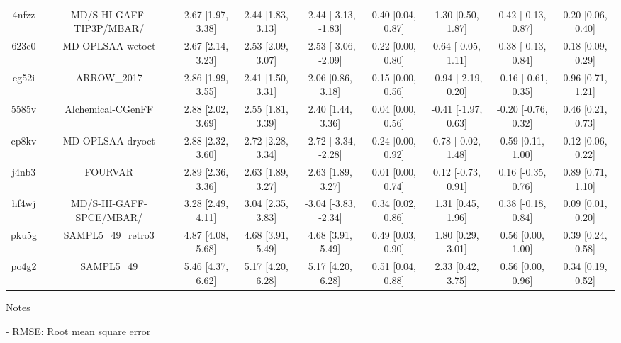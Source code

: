 \documentclass{article}
\begin{document}
\begin{center}
\begin{longtable}{|ccccccccc|}
 4nfzz &                           MD/S-HI-GAFF-TIP3P/MBAR/ &  2.67 [1.97, 3.38] &  2.44 [1.83, 3.13] &  -2.44 [-3.13, -1.83] &  0.40 [0.04, 0.87] &    1.30 [0.50, 1.87] &   0.42 [-0.13, 0.87] &     0.20 [0.06, 0.40] \\
 623c0 &                                   MD-OPLSAA-wetoct &  2.67 [2.14, 3.23] &  2.53 [2.09, 3.07] &  -2.53 [-3.06, -2.09] &  0.22 [0.00, 0.80] &   0.64 [-0.05, 1.11] &   0.38 [-0.13, 0.84] &     0.18 [0.09, 0.29] \\
 eg52i &                                        ARROW\_2017 &  2.86 [1.99, 3.55] &  2.41 [1.50, 3.31] &     2.06 [0.86, 3.18] &  0.15 [0.00, 0.56] &  -0.94 [-2.19, 0.20] &  -0.16 [-0.61, 0.35] &     0.96 [0.71, 1.21] \\
 5585v &                                  Alchemical-CGenFF &  2.88 [2.02, 3.69] &  2.55 [1.81, 3.39] &     2.40 [1.44, 3.36] &  0.04 [0.00, 0.56] &  -0.41 [-1.97, 0.63] &  -0.20 [-0.76, 0.32] &     0.46 [0.21, 0.73] \\
 cp8kv &                                   MD-OPLSAA-dryoct &  2.88 [2.32, 3.60] &  2.72 [2.28, 3.34] &  -2.72 [-3.34, -2.28] &  0.24 [0.00, 0.92] &   0.78 [-0.02, 1.48] &    0.59 [0.11, 1.00] &     0.12 [0.06, 0.22] \\
 j4nb3 &                                            FOURVAR &  2.89 [2.36, 3.36] &  2.63 [1.89, 3.27] &     2.63 [1.89, 3.27] &  0.01 [0.00, 0.74] &   0.12 [-0.73, 0.91] &   0.16 [-0.35, 0.76] &     0.89 [0.71, 1.10] \\
 hf4wj &                            MD/S-HI-GAFF-SPCE/MBAR/ &  3.28 [2.49, 4.11] &  3.04 [2.35, 3.83] &  -3.04 [-3.83, -2.34] &  0.34 [0.02, 0.86] &    1.31 [0.45, 1.96] &   0.38 [-0.18, 0.84] &     0.09 [0.01, 0.20] \\
 pku5g &                                 SAMPL5\_49\_retro3 &  4.87 [4.08, 5.68] &  4.68 [3.91, 5.49] &     4.68 [3.91, 5.49] &  0.49 [0.03, 0.90] &    1.80 [0.29, 3.01] &    0.56 [0.00, 1.00] &     0.39 [0.24, 0.58] \\
 po4g2 &                                         SAMPL5\_49 &  5.46 [4.37, 6.62] &  5.17 [4.20, 6.28] &     5.17 [4.20, 6.28] &  0.51 [0.04, 0.88] &    2.33 [0.42, 3.75] &    0.56 [0.00, 0.96] &     0.34 [0.19, 0.52] \\
\end{longtable}
\end{center}

Notes

- RMSE: Root mean square error
\end{document}
